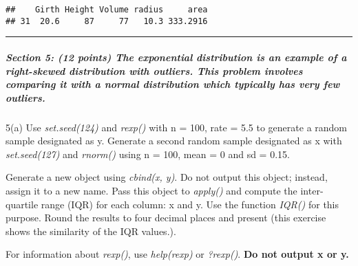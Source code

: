 \documentclass[
]{article}
\begin{document}
\begin{verbatim}
##    Girth Height Volume radius     area
## 31  20.6     87     77   10.3 333.2916
\end{verbatim}

\begin{center}\rule{0.5\linewidth}{0.5pt}\end{center}

\hypertarget{section-5-12-points-the-exponential-distribution-is-an-example-of-a-right-skewed-distribution-with-outliers.-this-problem-involves-comparing-it-with-a-normal-distribution-which-typically-has-very-few-outliers.}{%
\subparagraph{Section 5: (12 points) The exponential distribution is an
example of a right-skewed distribution with outliers. This problem
involves comparing it with a normal distribution which typically has
very few
outliers.}\label{section-5-12-points-the-exponential-distribution-is-an-example-of-a-right-skewed-distribution-with-outliers.-this-problem-involves-comparing-it-with-a-normal-distribution-which-typically-has-very-few-outliers.}}

5(a) Use \emph{set.seed(124)} and \emph{rexp()} with n = 100, rate = 5.5
to generate a random sample designated as y. Generate a second random
sample designated as x with \emph{set.seed(127)} and \emph{rnorm()}
using n = 100, mean = 0 and sd = 0.15.

Generate a new object using \emph{cbind(x, y)}. Do not output this
object; instead, assign it to a new name. Pass this object to
\emph{apply()} and compute the inter-quartile range (IQR) for each
column: x and y. Use the function \emph{IQR()} for this purpose. Round
the results to four decimal places and present (this exercise shows the
similarity of the IQR values.).

For information about \emph{rexp()}, use \emph{help(rexp)} or
\emph{?rexp()}. \textbf{Do not output x or y.}
\end{document}
